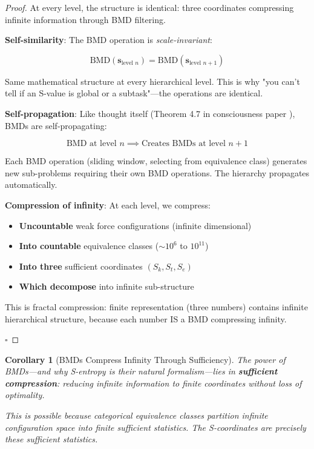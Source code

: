 \documentclass[12pt,a4paper]{article}
\newtheorem{corollary}[theorem]{Corollary}
\begin{document}
\begin{proof}
At every level, the structure is identical: three coordinates compressing infinite information through BMD filtering.

\textbf{Self-similarity}: The BMD operation is \textit{scale-invariant}:

\begin{equation}
\text{BMD}(\mathbf{s}_{\text{level } n}) = \text{BMD}(\mathbf{s}_{\text{level } n+1})
\end{equation}

Same mathematical structure at every hierarchical level. This is why "you can't tell if an S-value is global or a subtask"—the operations are identical.

\textbf{Self-propagation}: Like thought itself (Theorem 4.7 in consciousness paper \cite{sachikonye2024consciousness}), BMDs are self-propagating:

\begin{equation}
\text{BMD at level } n \implies \text{Creates BMDs at level } n+1
\end{equation}

Each BMD operation (sliding window, selecting from equivalence class) generates new sub-problems requiring their own BMD operations. The hierarchy propagates automatically.

\textbf{Compression of infinity}: At each level, we compress:
\begin{itemize}
\item \textbf{Uncountable} weak force configurations (infinite dimensional)
\item \textbf{Into countable} equivalence classes ($\sim 10^6$ to $10^{11}$)
\item \textbf{Into three} sufficient coordinates $(S_k, S_t, S_e)$
\item \textbf{Which decompose} into infinite sub-structure
\end{itemize}

This is fractal compression: finite representation (three numbers) contains infinite hierarchical structure, because each number IS a BMD compressing infinity.

$\square$
\end{proof}

\begin{corollary}[BMDs Compress Infinity Through Sufficiency]
\label{cor:compress_infinity}
The power of BMDs—and why S-entropy is their natural formalism—lies in \textbf{sufficient compression}: reducing infinite information to finite coordinates without loss of optimality.

This is possible because categorical equivalence classes partition infinite configuration space into finite sufficient statistics. The S-coordinates are precisely these sufficient statistics.
\end{corollary}
\end{document}

